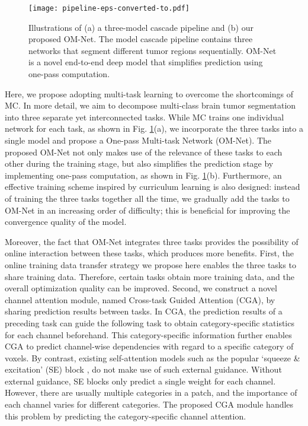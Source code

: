 \documentclass[journal,twoside]{IEEEtran}
\begin{document}
\begin{figure} 
	\centering
	\texttt{[image: pipeline-eps-converted-to.pdf]}	
	\caption{Illustrations of (a) a three-model cascade pipeline and (b) our proposed OM-Net. The model cascade pipeline contains three networks that segment different tumor regions sequentially. OM-Net is a novel end-to-end deep model that simplifies prediction using one-pass computation. 
	}
	\label{Fig.0}
\end{figure}




Here, we propose adopting multi-task learning to overcome the shortcomings of MC. In more detail, we aim to decompose multi-class brain tumor segmentation into three separate yet interconnected tasks. While MC trains one individual network for each task, as shown in Fig. \ref{Fig.0}(a), we incorporate the three tasks into a single model and propose a One-pass Multi-task Network (OM-Net). The proposed OM-Net not only makes use of the relevance of these tasks to each other during the training stage, but also simplifies the prediction stage by implementing one-pass computation, as shown in Fig. \ref{Fig.0}(b). Furthermore, an effective training scheme inspired by curriculum learning is also designed: instead of training the three tasks together all the time, we gradually add the tasks to OM-Net in an increasing order of difficulty; this is beneficial for improving the convergence quality of the model.




Moreover, the fact that OM-Net integrates three tasks provides the possibility of online interaction between these tasks, which produces more benefits. First, the online training data transfer strategy we propose here enables the three tasks to share training data. Therefore, certain tasks obtain more training data, and the overall optimization quality can be improved. Second, we construct a novel channel attention module, named Cross-task Guided Attention (CGA), by sharing prediction results between tasks. In CGA, the prediction results of a preceding task can guide the following task to obtain category-specific statistics for each channel beforehand. This category-specific information further enables CGA to predict channel-wise dependencies with regard to a specific category of voxels. By contrast, existing self-attention models such as the popular `squeeze \& excitation' (SE) block \cite{Hu_2018_CVPR}, do not make use of such external guidance. Without external guidance, SE blocks only predict a single weight for each channel. However, there are usually multiple categories in a patch, and the importance of each channel varies for different categories. The proposed CGA module handles this problem by predicting the category-specific channel attention. 
\end{document}
